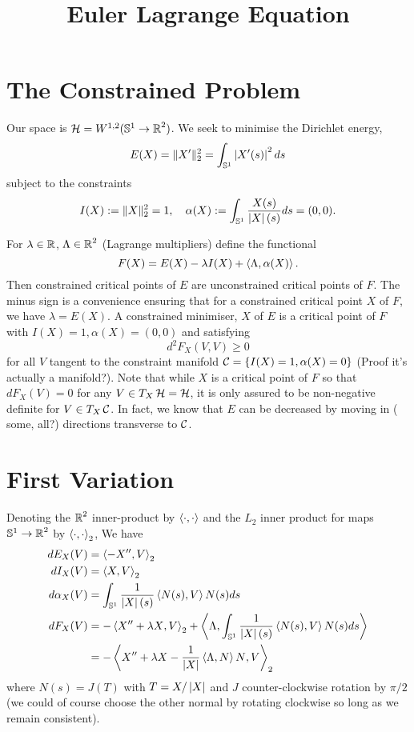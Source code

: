 \documentclass[12pt]{article}
\title{Euler Lagrange Equation}
\author{}
\date{}
\begin{document}
\maketitle

\section{The Constrained Problem}
\label{sec:constrained}

Our space is \(\operatorname{\mathcal{H}} = W^{1,2} (\operatorname{\mathbb{S}^1} \to \operatorname{\mathbb{R}}^2)\). We seek to minimise the Dirichlet energy,
\[
E(X) = \|X'\|_2^2 = \int_{\operatorname{\mathbb{S}^1}} \left|{X'(s)}\right|^2 ds
\]
subject to the constraints
\[
I(X) := \|X\|_2^2 = 1, \quad \alpha(X) := \int_{\operatorname{\mathbb{S}^1}} \frac{X(s)}{\left|{X}\right|(s)} ds = (0, 0).
\]

For \(\lambda \in \operatorname{\mathbb{R}}\), \(\Lambda \in \operatorname{\mathbb{R}}^2\) (Lagrange multipliers) define the functional
\[
F(X) = E(X) - \lambda I(X) + \left\langle{\Lambda},{\alpha(X)}\right\rangle.
\]
Then constrained critical points of \(E\) are unconstrained critical points of \(F\). The minus sign is a convenience ensuring that for a constrained critical point \(X\) of \(F\), we have \(\lambda = E(X)\). A constrained minimiser, \(X\) of \(E\) is a critical point of \(F\) with \(I(X) = 1, \alpha(X) = (0, 0)\) and satisfying
\[
d^2 F_X (V, V) \geq 0
\]
for all \(V\) tangent to the constraint manifold \(\operatorname{\mathcal{C}} = \{I(X) = 1, \alpha(X) = 0\}\) ({\color{red}Proof it's actually a manifold?}). Note that while \(X\) is a critical point of \(F\) so that \(dF_X (V) = 0\) for any \(V \in T_X\operatorname{\mathcal{H}} = \operatorname{\mathcal{H}}\), it is only assured to be non-negative definite for \(V \in T_X \operatorname{\mathcal{C}}\). In fact, we know that \(E\) can be decreased by moving in ({\color{red} some, all?}) directions transverse to \(\operatorname{\mathcal{C}}\).

\section{First Variation}
\label{sec:firstvar}

Denoting the \(\operatorname{\mathbb{R}}^2\) inner-product by \(\left\langle{\cdot},{\cdot}\right\rangle\) and the \(L_2\) inner product for maps \(\operatorname{\mathbb{S}^1} \to \operatorname{\mathbb{R}}^2\) by \(\left\langle{\cdot},{\cdot}\right\rangle_2\), We have
\begin{align*}
dE_X (V) &= \left\langle{-X''},{V}\right\rangle_2 \\
dI_X (V) &= \left\langle{X},{V}\right\rangle_2 \\
d\alpha_X (V) &= \int_{\operatorname{\mathbb{S}^1}} \frac{1}{\left|{X}\right|(s)} \left\langle{N(s)},{V}\right\rangle N(s) ds \\
dF_X (V) &= -\left\langle{X'' + \lambda X},{V}\right\rangle_2 + \left\langle{\Lambda},{\int_{\operatorname{\mathbb{S}^1}} \frac{1}{\left|{X}\right|(s)} \left\langle{N(s)},{V}\right\rangle N(s) ds}\right\rangle \\
&= -\left\langle{X'' + \lambda X - \frac{1}{\left|{X}\right|} \ensuremath{\left\langle{\Lambda},{N}\right\rangle}N},{V}\right\rangle_2
\end{align*}
where \(N(s) = J(T)\) with \(T = X/\left|{X}\right|\) and \(J\) counter-clockwise rotation by \(\pi/2\) (we could of course choose the other normal by rotating clockwise so long as we remain consistent).
\end{document}
